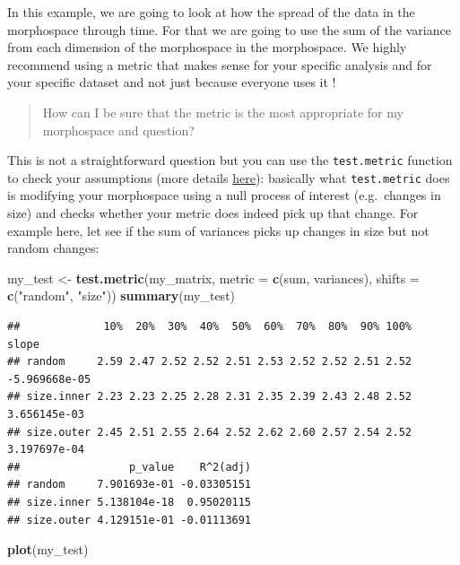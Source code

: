 \documentclass[]{book}
\newenvironment{Shaded}{\begin{snugshade}}{\end{snugshade}}
\newcommand{\DataTypeTok}[1]{\textcolor[rgb]{0.13,0.29,0.53}{#1}}
\newcommand{\KeywordTok}[1]{\textcolor[rgb]{0.13,0.29,0.53}{\textbf{#1}}}
\newcommand{\NormalTok}[1]{#1}
\newcommand{\StringTok}[1]{\textcolor[rgb]{0.31,0.60,0.02}{#1}}
\begin{document}
In this example, we are going to look at how the spread of the data in the morphospace through time.
For that we are going to use the sum of the variance from each dimension of the morphospace in the morphospace.
We highly recommend using a metric that makes sense for your specific analysis and for your specific dataset and not just because everyone uses it \citep[\citet{Guillerme2020}]{moms}!

\begin{quote}
How can I be sure that the metric is the most appropriate for my morphospace and question?
\end{quote}

This is not a straightforward question but you can use the \texttt{test.metric} function to check your assumptions (more details \protect\hyperlink{disparity-metrics}{here}): basically what \texttt{test.metric} does is modifying your morphospace using a null process of interest (e.g.~changes in size) and checks whether your metric does indeed pick up that change.
For example here, let see if the sum of variances picks up changes in size but not random changes:

\begin{Shaded}
\begin{Highlighting}[]
\NormalTok{my_test <-}\StringTok{ }\KeywordTok{test.metric}\NormalTok{(my_matrix, }\DataTypeTok{metric =} \KeywordTok{c}\NormalTok{(sum, variances), }\DataTypeTok{shifts =} \KeywordTok{c}\NormalTok{(}\StringTok{"random"}\NormalTok{, }\StringTok{"size"}\NormalTok{))}
\KeywordTok{summary}\NormalTok{(my_test)}
\end{Highlighting}
\end{Shaded}

\begin{verbatim}
##             10%  20%  30%  40%  50%  60%  70%  80%  90% 100%         slope
## random     2.59 2.47 2.52 2.52 2.51 2.53 2.52 2.52 2.51 2.52 -5.969668e-05
## size.inner 2.23 2.23 2.25 2.28 2.31 2.35 2.39 2.43 2.48 2.52  3.656145e-03
## size.outer 2.45 2.51 2.55 2.64 2.52 2.62 2.60 2.57 2.54 2.52  3.197697e-04
##                 p_value    R^2(adj)
## random     7.901693e-01 -0.03305151
## size.inner 5.138104e-18  0.95020115
## size.outer 4.129151e-01 -0.01113691
\end{verbatim}

\begin{Shaded}
\begin{Highlighting}[]
\KeywordTok{plot}\NormalTok{(my_test)}
\end{Highlighting}
\end{Shaded}
\end{document}
